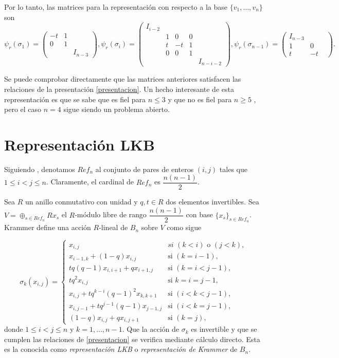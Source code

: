 \documentclass[TFG.tex]{subfiles}
\begin{document}
Por lo tanto, las matrices para la representación con respecto a la base $\{v_1,\dots, v_n\}$ son
\[
\psi_r(\sigma_1)=\begin{pmatrix}
-t & 1 & \\
0 & 1 & \\
& & I_{n-3}
\end{pmatrix},\psi_r(\sigma_i )=\begin{pmatrix}
I_{i-2} & & &\\
& 1 & 0 & 0 & \\
& t & -t & 1 & \\
& 0 & 0 & 1 & \\
& & & & I_{n-i-2}  
\end{pmatrix}, \psi_r(\sigma_{n-1})=\begin{pmatrix}
I_{n-3} & &\\
1 & 0 & \\
t & -t & 
\end{pmatrix}.
\]

Se puede comprobar directamente que las matrices anteriores satisfacen las relaciones de la presentación \ref{presentacion}. Un hecho interesante de esta representación es que se sabe que es fiel para $n\leq 3$ \cite{Birman} y que no es fiel para $n\geq 5$ \cite{Bil}\cite{LP}, pero el caso $n=4$ sigue siendo un problema abierto.

\section{Representación LKB}
Siguiendo \cite{Krammer}, denotamos $Ref_n$ al conjunto de pares de enteros $(i,j)$ tales que $1\leq i<j\leq n$. Claramente, el cardinal de $Ref_n$ es $\dfrac{n(n-1)}{2}$.

Sea $R$ un anillo conmutativo con unidad y $q,t\in R$ dos elementos invertibles. Sea $V=\oplus_{s\in Ref_n}Rx_s$ el $R$-módulo libre de rango $\dfrac{n(n-1)}{2}$ con base $\{x_s\}_{s\in Ref_n}$. Krammer \cite{Krammer} define una acción $R$-lineal de $B_n$ sobre $V$ como sigue


\begin{equation}\label{LKB}
\sigma_k(x_{i,j})=\begin{cases}
x_{i,j} & \textit{si }(k<i)\text{ o }(j<k),\\
x_{i-1,k}+(1-q)x_{i,j} & \text{si } (k=i-1),\\
tq(q-1)x_{i,i+1}+qx_{i+1,j} & \text{si }(k=i<j-1),\\
tq^2x_{i,j} & \text{si }k=i=j-1,\\
x_{i,j}+tq^{k-i}(q-1)^2x_{k,k+1} & \text{si }(i<k<j-1),\\
x_{i,j-1}+tq^{j-1}(q-1)x_{j-1,j} & \text{si }(i<k=j-1),\\
(1-q)x_{i,j}+qx_{i,j+1} & \text{si }(k=j),
\end{cases}
\end{equation}
donde $1\leq i<j\leq n$ y $k=1,\dots, n-1$. Que la acción de $\sigma_k$ es invertible y que se cumplen las relaciones de \ref{presentacion} se verifica mediante cálculo directo. Esta es la conocida como \emph{representación LKB} o \emph{representación de Krammer} de $B_n$.
\end{document}

